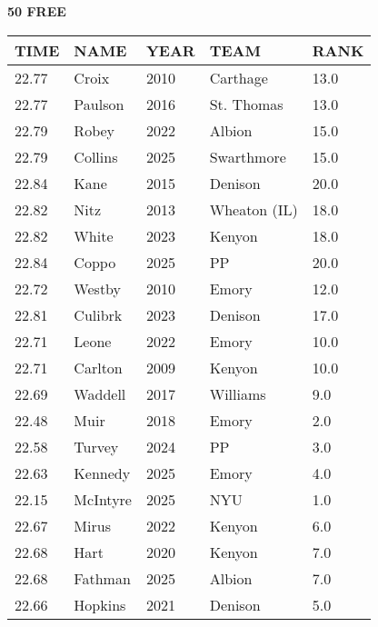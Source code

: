 \begin{minipage}[t]{0.48\textwidth}
\centering
\textbf{50 FREE}\\[0.05cm]
\begin{tabular}{@{}p{1.8cm}p{2.8cm}p{1.2cm}p{1.4cm}p{0.8cm}@{}}
\hline
\textbf{TIME} & \textbf{NAME} & \textbf{YEAR} & \textbf{TEAM} & \textbf{RANK} \\
\hline
22.77 & Croix & 2010 & Carthage & 13.0 \\
22.77 & Paulson & 2016 & St. Thomas & 13.0 \\
22.79 & Robey & 2022 & Albion & 15.0 \\
22.79 & Collins & 2025 & Swarthmore & 15.0 \\
22.84 & Kane & 2015 & Denison & 20.0 \\
22.82 & Nitz & 2013 & Wheaton (IL) & 18.0 \\
22.82 & White & 2023 & Kenyon & 18.0 \\
22.84 & Coppo & 2025 & PP & 20.0 \\
22.72 & Westby & 2010 & Emory & 12.0 \\
22.81 & Culibrk & 2023 & Denison & 17.0 \\
22.71 & Leone & 2022 & Emory & 10.0 \\
22.71 & Carlton & 2009 & Kenyon & 10.0 \\
22.69 & Waddell & 2017 & Williams & 9.0 \\
22.48 & Muir & 2018 & Emory & 2.0 \\
22.58 & Turvey & 2024 & PP & 3.0 \\
22.63 & Kennedy & 2025 & Emory & 4.0 \\
22.15 & McIntyre & 2025 & NYU & 1.0 \\
22.67 & Mirus & 2022 & Kenyon & 6.0 \\
22.68 & Hart & 2020 & Kenyon & 7.0 \\
22.68 & Fathman & 2025 & Albion & 7.0 \\
22.66 & Hopkins & 2021 & Denison & 5.0 \\
\hline
\end{tabular}
\end{minipage}\hfill
